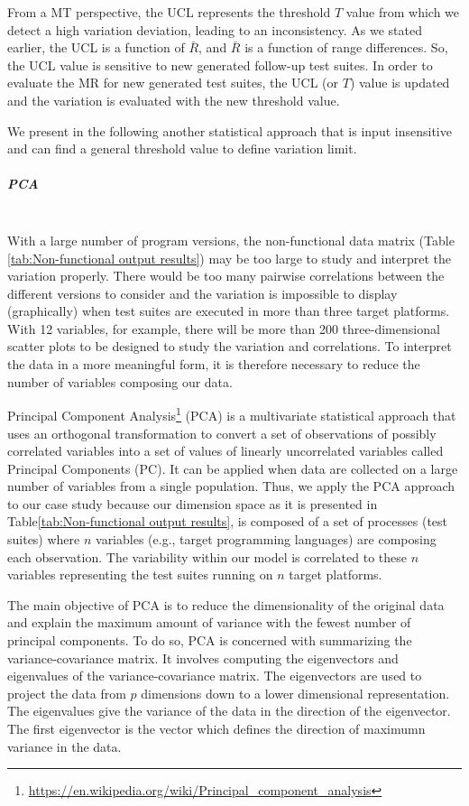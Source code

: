 From a MT perspective, the UCL represents the threshold $T$ value from which we detect a high variation deviation, leading to an inconsistency. As we stated earlier, the UCL is a function of $\bar{R}$, and $\bar{R}$ is a function of range differences. So, the UCL value is sensitive to new generated follow-up test suites. In order to evaluate the MR for new generated test suites, the UCL (or $T$) value is updated and the variation is evaluated with the new threshold value. 

We present in the following another statistical approach that is input insensitive and can find a general threshold value to define variation limit.







\subparagraph{PCA}~\\

With a large number of program versions, the non-functional data matrix (Table \ref{tab:Non-functional output results}) may be too large to study and interpret the variation properly. There would be too many pairwise correlations between the different versions to consider and the variation is impossible to display (graphically) when test suites are executed in more than three target platforms.
With 12 variables, for example, there will be more than 200 three-dimensional scatter plots to be designed to study the variation and correlations.
To interpret the data in a more meaningful form, it is therefore necessary to reduce the number of variables composing our data.

Principal Component Analysis\footnote{\url{https://en.wikipedia.org/wiki/Principal_component_analysis}} (PCA) is a multivariate statistical approach that uses an orthogonal transformation to convert a set of observations of possibly correlated variables into a set of values of linearly uncorrelated variables called Principal Components (PC). It can be applied when data are collected on a large number of variables from a single population. Thus, we apply the PCA approach to our case study because our dimension space as it is presented in Table\ref{tab:Non-functional output results}, is composed of a set of processes (test suites) where $n$ variables (e.g., target programming languages) are composing each observation. The variability within our model is correlated to these $n$ variables representing the test suites running on $n$ target platforms. 

The main objective of PCA is to reduce the dimensionality of the original data and explain the maximum amount of variance with the fewest number of principal components. To do so, PCA is concerned with summarizing the variance-covariance matrix. It involves computing the eigenvectors and eigenvalues of the variance-covariance matrix. The eigenvectors are used to project the data from $p$ dimensions down to a lower dimensional representation. The eigenvalues give the variance of the data in the direction of the eigenvector. The first eigenvector is the vector which defines the direction of maximumn variance in the data.

